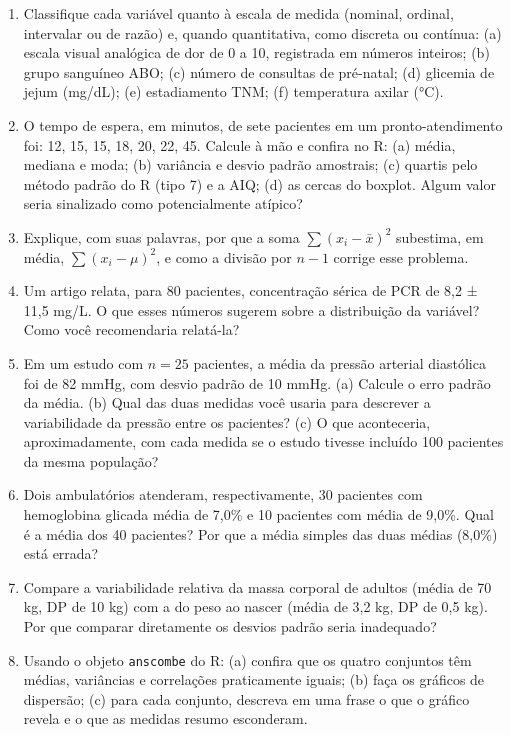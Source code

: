 \documentclass[
]{book}
\begin{document}
\begin{enumerate}
\def\labelenumi{\arabic{enumi}.}
\item
  Classifique cada variável quanto à escala de medida (nominal, ordinal, intervalar ou de razão) e, quando quantitativa, como discreta ou contínua: (a) escala visual analógica de dor de 0 a 10, registrada em números inteiros; (b) grupo sanguíneo ABO; (c) número de consultas de pré-natal; (d) glicemia de jejum (mg/dL); (e) estadiamento TNM; (f) temperatura axilar (°C).
\item
  O tempo de espera, em minutos, de sete pacientes em um pronto-atendimento foi: 12, 15, 15, 18, 20, 22, 45. Calcule à mão e confira no R: (a) média, mediana e moda; (b) variância e desvio padrão amostrais; (c) quartis pelo método padrão do R (tipo 7) e a AIQ; (d) as cercas do boxplot. Algum valor seria sinalizado como potencialmente atípico?
\item
  Explique, com suas palavras, por que a soma \(\sum (x_i - \bar{x})^2\) subestima, em média, \(\sum (x_i - \mu)^2\), e como a divisão por \(n - 1\) corrige esse problema.
\item
  Um artigo relata, para 80 pacientes, concentração sérica de PCR de 8,2 ± 11,5 mg/L. O que esses números sugerem sobre a distribuição da variável? Como você recomendaria relatá-la?
\item
  Em um estudo com \(n = 25\) pacientes, a média da pressão arterial diastólica foi de 82 mmHg, com desvio padrão de 10 mmHg. (a) Calcule o erro padrão da média. (b) Qual das duas medidas você usaria para descrever a variabilidade da pressão entre os pacientes? (c) O que aconteceria, aproximadamente, com cada medida se o estudo tivesse incluído 100 pacientes da mesma população?
\item
  Dois ambulatórios atenderam, respectivamente, 30 pacientes com hemoglobina glicada média de 7,0\% e 10 pacientes com média de 9,0\%. Qual é a média dos 40 pacientes? Por que a média simples das duas médias (8,0\%) está errada?
\item
  Compare a variabilidade relativa da massa corporal de adultos (média de 70 kg, DP de 10 kg) com a do peso ao nascer (média de 3,2 kg, DP de 0,5 kg). Por que comparar diretamente os desvios padrão seria inadequado?
\item
  Usando o objeto \texttt{anscombe} do R: (a) confira que os quatro conjuntos têm médias, variâncias e correlações praticamente iguais; (b) faça os gráficos de dispersão; (c) para cada conjunto, descreva em uma frase o que o gráfico revela e o que as medidas resumo esconderam.
\end{enumerate}
\end{document}
